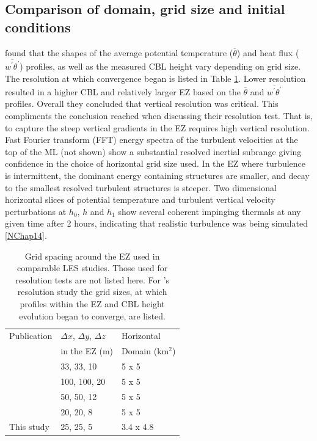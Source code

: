 \documentclass[referee]{svjour3}
\begin{document}

\subsection{Comparison of domain, grid size and initial conditions}

\cite{SullPat} found that the shapes of the average potential temperature ($\overline{\theta}$) and heat flux ($\overline{w^{'}\theta^{'}}$) profiles, as well as the measured CBL height vary depending on grid size.  The resolution at which convergence began is listed in Table \ref{table:gridcomp}.  Lower resolution resulted in a higher CBL and relatively larger EZ based on the $\overline{\theta}$ and $\overline{w^{'}\theta^{'}}$ profiles.  Overall they concluded that vertical resolution was critical.  This compliments the conclusion \cite{BrooksFowler2} reached when discussing their resolution test.  That is, to capture the steep vertical gradients in the EZ requires high vertical resolution. \\

Fast Fourier transform (FFT) energy spectra of the turbulent velocities at the top of the ML (not shown) show a substantial resolved inertial subrange giving confidence in the choice of horizontal grid size used. In the EZ where turbulence is intermittent, the dominant energy containing structures are smaller, and decay to the smallest resolved turbulent structures is steeper. Two dimensional horizontal slices of potential temperature and turbulent vertical velocity perturbations at $h_{0}$, $h$ and $h_{1}$ show several coherent impinging thermals at any given time after 2 hours, indicating that realistic turbulence was being simulated \ref{NChap14}.\\

\begin{table}[htbp]
\caption[Comparison of Grid-Sizes used in similar Studies]{Grid spacing around the EZ used in comparable LES studies. Those used for resolution tests are not listed here.  For \cite{SullPat}'s resolution study the grid sizes, at which profiles within the EZ and CBL height evolution began to converge, are listed.}

    \begin{tabular}{p{4cm} p{2cm} p{2cm}}
Publication & $\Delta x$, $\Delta y$, $\Delta z$ & Horizontal \\
 & in the EZ (m) & Domain (km$^{2}$) \\ \hline
      \cite{SullMoengStev}& 33, 33, 10 & 5 x 5 \\ 
      \cite{FedConzMir04}& 100, 100, 20 & 5 x 5 \\ 
      \cite{BrooksFowler2}& 50, 50, 12 & 5 x 5 \\
      \cite{SullPat} &  20, 20, 8 & 5 x 5\\
      This study & 25, 25, 5 &  3.4 x 4.8\\ \hline       
    \end{tabular}
\label{table:gridcomp}   
\end{table}
\end{document}
